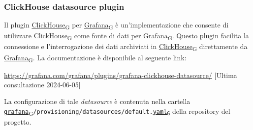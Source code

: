 \subsubsection{ClickHouse datasource plugin}
Il plugin \href{https://7last.github.io/docs/pb/documentazione-interna/glossario\#clickhouse}{ClickHouse\textsubscript{G}} per \href{https://7last.github.io/docs/pb/documentazione-interna/glossario\#grafana}{Grafana\textsubscript{G}} è un'implementazione che consente di utilizzare \href{https://7last.github.io/docs/pb/documentazione-interna/glossario\#clickhouse}{ClickHouse\textsubscript{G}} come fonte di dati per \href{https://7last.github.io/docs/pb/documentazione-interna/glossario\#grafana}{Grafana\textsubscript{G}}. Questo plugin facilita la connessione e l'interrogazione dei dati archiviati in \href{https://7last.github.io/docs/pb/documentazione-interna/glossario\#clickhouse}{ClickHouse\textsubscript{G}} direttamente da \href{https://7last.github.io/docs/pb/documentazione-interna/glossario\#grafana}{Grafana\textsubscript{G}}.
La documentazione è disponibile al seguente link:
\begin{center}
	\url{https://grafana.com/grafana/plugins/grafana-clickhouse-datasource/} [Ultima consultazione 2024-06-05]
\end{center}
La configurazione di tale \textit{datasource} è contenuta nella cartella \\
\href{https://7last.github.io/docs/pb/documentazione-interna/glossario\#grafana}{\texttt{grafana}\textsubscript{G}}\texttt{/provisioning/datasources/default.\href{https://7last.github.io/docs/pb/documentazione-interna/glossario\#yet-another-markup-language}{yaml\textsubscript{G}}} della repository del progetto.


